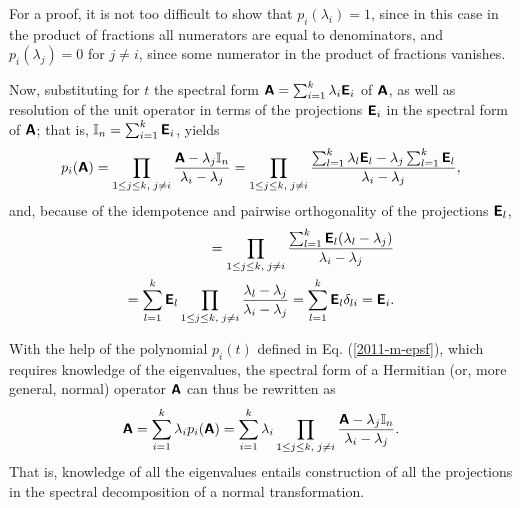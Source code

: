 {\color{OliveGreen}\bproof

For a proof, it is not too difficult
to show that
$p_i  (\lambda_i)=1$, since in this case in the product of fractions all numerators are equal to denominators,
and
$p_i  (\lambda_j)=0$ for $j\neq i $, since some numerator in the product of fractions vanishes.

Now, substituting for $t$ the spectral form $\textsf{\textbf{A}}=\sum_{i=1}^k \lambda_i\textsf{\textbf{E}}_i$
of $\textsf{\textbf{A}}$, as well as
resolution of the unit operator in terms of the projections $\textsf{\textbf{E}}_i$ in the spectral form of
$\textsf{\textbf{A}}$; that is, ${\Bbb I}_n=\sum_{i=1}^k \textsf{\textbf{E}}_i$,
yields
\begin{equation}
p_i  (\textsf{\textbf{A}})
=
\prod_{
1\le j\le k,\;
j\neq i
}\frac{\textsf{\textbf{A}} - \lambda_j{\Bbb I}_n}{\lambda_i -\lambda_j}
=
\prod_{
1\le j\le k,\;
j\neq i
}\frac{\sum_{l=1}^k \lambda_l\textsf{\textbf{E}}_l - \lambda_j\sum_{l=1}^k \textsf{\textbf{E}}_l}{\lambda_i -\lambda_j},
\end{equation}
and, because of the idempotence and pairwise orthogonality of the projections  $\textsf{\textbf{E}}_l$,
\begin{equation}
\begin{split}
=
\prod_{
1\le j\le k,\;
j\neq i
}\frac{\sum_{l=1}^k \textsf{\textbf{E}}_l(\lambda_l- \lambda_j)}{\lambda_i -\lambda_j}  \\
= \sum_{l=1}^k \textsf{\textbf{E}}_l
\prod_{
1\le j\le k,\;
j\neq i
}\frac{\lambda_l- \lambda_j}{\lambda_i -\lambda_j}
= \sum_{l=1}^k \textsf{\textbf{E}}_l
\delta_{li} = \textsf{\textbf{E}}_i.
\label{2012-m-ch-fdvs-cc}
\end{split}
\end{equation}
\eproof
}

With the help of the polynomial $p_i(t)$ defined in Eq. (\ref{2011-m-epsf}),
which requires knowledge of the eigenvalues,
the spectral form of a Hermitian (or, more general, normal) operator  $\textsf{\textbf{A}}$ can thus be rewritten as
\begin{equation}
\textsf{\textbf{A}}=\sum_{i=1}^k \lambda_i p_i(\textsf{\textbf{A}})=  \sum_{i=1}^k \lambda_i \prod_{
1\le j\le k,\;
j\neq i
}\frac{\textsf{\textbf{A}} - \lambda_j{\Bbb I}_n}{\lambda_i -\lambda_j}.
\end{equation}
That is, knowledge of all the eigenvalues entails construction
of all the projections in the spectral decomposition
of a normal transformation.


